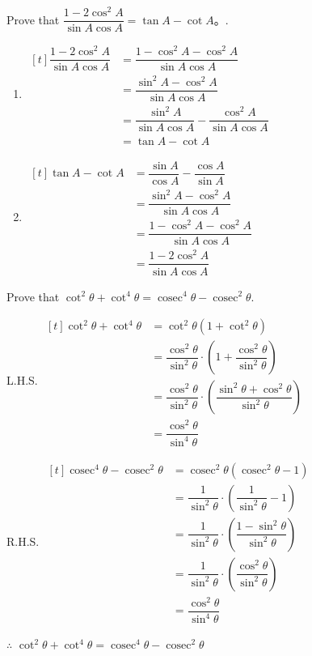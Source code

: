 \documentclass{report}
\begin{document}
\begin{question}
	Prove that $\dfrac{1-2 \cos ^2 A}{\sin A \cos A}=\tan A-\cot A 。$.
	
	\begin{enumerate}[label=\textbf{Approach (\arabic*)}, leftmargin=*, labelsep=1.5em]
		\item $\begin{aligned}[t] \dfrac{1-2 \cos ^2 A}{\sin A \cos A} & =\dfrac{1-\cos ^2 A-\cos ^2 A}{\sin A \cos A} \\ & =\dfrac{\sin ^2 A-\cos ^2 A}{\sin A \cos A} \\ & =\dfrac{\sin ^2 A}{\sin A \cos A}-\dfrac{\cos ^2 A}{\sin A \cos A} \\ & =\tan A-\cot A\end{aligned}$
		\item $\begin{aligned}[t] \tan A-\cot A & =\dfrac{\sin A}{\cos A}-\dfrac{\cos A}{\sin A} \\ & =\dfrac{\sin ^2 A-\cos ^2 A}{\sin A \cos A} \\ & =\dfrac{1-\cos ^2 A-\cos ^2 A}{\sin A \cos A} \\ & =\dfrac{1-2 \cos ^2 A}{\sin A \cos A}\end{aligned}$
	\end{enumerate}
\end{question}
\begin{question}
	Prove that $\cot ^2 \theta+\cot ^4 \theta=\operatorname{cosec}^4 \theta-\operatorname{cosec}^2 \theta$.
	
	\proof{}
	    
	\noindent L.H.S. $\begin{aligned}[t] \cot ^2 \theta+\cot ^4 \theta & =\cot ^2 \theta\left(1+\cot ^2 \theta\right) \\ & =\dfrac{\cos ^2 \theta}{\sin ^2 \theta} \cdot\left(1+\dfrac{\cos ^2 \theta}{\sin ^2 \theta}\right) \\ & =\dfrac{\cos ^2 \theta}{\sin ^2 \theta} \cdot\left(\dfrac{\sin ^2 \theta+\cos ^2 \theta}{\sin ^2 \theta}\right) \\ & =\dfrac{\cos ^2 \theta}{\sin ^4 \theta}\end{aligned}$
	
	\noindent R.H.S. $\begin{aligned}[t]\operatorname{cosec}^4 \theta-\operatorname{cosec}^2 \theta&=\operatorname{cosec}^2 \theta\left(\operatorname{cosec}^2 \theta-1\right)\\
	& =\dfrac{1}{\sin ^2 \theta} \cdot\left(\dfrac{1}{\sin ^2 \theta}-1\right) \\
	& =\dfrac{1}{\sin ^2 \theta} \cdot\left(\dfrac{1-\sin ^2 \theta}{\sin ^2 \theta}\right) \\
	& =\dfrac{1}{\sin ^2 \theta} \cdot\left(\dfrac{\cos ^2 \theta}{\sin ^2 \theta}\right) \\
	& =\dfrac{\cos ^2 \theta}{\sin ^4 \theta}
	\end{aligned}
	$
	
	\noindent $\therefore$ $\cot ^2 \theta+\cot ^4 \theta=\operatorname{cosec}^4 \theta-\operatorname{cosec}^2 \theta$
\end{question}
\end{document}
